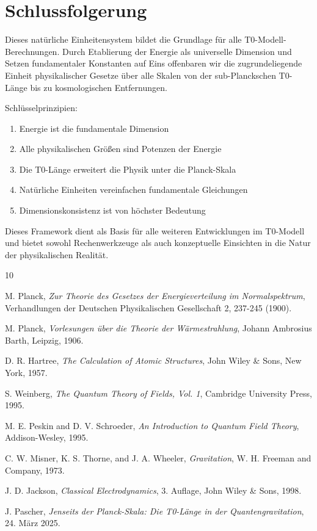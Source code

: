 	\section{Schlussfolgerung}
	
	Dieses natürliche Einheitensystem bildet die Grundlage für alle T0-Modell-Berechnungen. Durch Etablierung der Energie als universelle Dimension und Setzen fundamentaler Konstanten auf Eins offenbaren wir die zugrundeliegende Einheit physikalischer Gesetze über alle Skalen von der sub-Planckschen T0-Länge bis zu kosmologischen Entfernungen.
	
	Schlüsselprinzipien:
	\begin{enumerate}
		\item Energie ist die fundamentale Dimension
		\item Alle physikalischen Größen sind Potenzen der Energie
		\item Die T0-Länge erweitert die Physik unter die Planck-Skala
		\item Natürliche Einheiten vereinfachen fundamentale Gleichungen
		\item Dimensionskonsistenz ist von höchster Bedeutung
	\end{enumerate}
	
	Dieses Framework dient als Basis für alle weiteren Entwicklungen im T0-Modell und bietet sowohl Rechenwerkzeuge als auch konzeptuelle Einsichten in die Natur der physikalischen Realität.
	
	
	\begin{thebibliography}{10}
		
		M. Planck,
		\textit{Zur Theorie des Gesetzes der Energieverteilung im Normalspektrum},
		Verhandlungen der Deutschen Physikalischen Gesellschaft 2, 237-245 (1900).
		
		M. Planck,
		\textit{Vorlesungen über die Theorie der Wärmestrahlung},
		Johann Ambrosius Barth, Leipzig, 1906.
		
		D. R. Hartree,
		\textit{The Calculation of Atomic Structures},
		John Wiley \& Sons, New York, 1957.
		
		S. Weinberg,
		\textit{The Quantum Theory of Fields, Vol. 1},
		Cambridge University Press, 1995.
		
		M. E. Peskin and D. V. Schroeder,
		\textit{An Introduction to Quantum Field Theory},
		Addison-Wesley, 1995.
		
		C. W. Misner, K. S. Thorne, and J. A. Wheeler,
		\textit{Gravitation},
		W. H. Freeman and Company, 1973.
		
		J. D. Jackson,
		\textit{Classical Electrodynamics},
		3. Auflage, John Wiley \& Sons, 1998.
		
		J. Pascher,
		\textit{Jenseits der Planck-Skala: Die T0-Länge in der Quantengravitation},
		24. März 2025.
		
	\end{thebibliography}
	